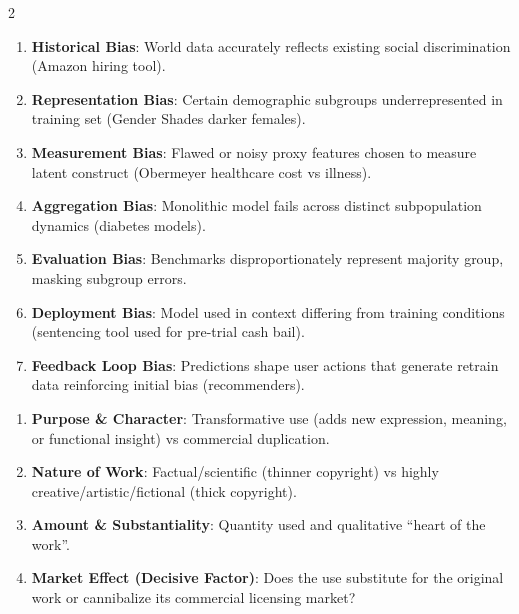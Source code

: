 \documentclass[9pt,a4paper]{extarticle}
\begin{document}
\begin{multicols}{2}
\begin{tcolorbox}[compact,colframe=secondary,title={3.5 The 7 Core AI Bias Types}]
\begin{enumerate}[leftmargin=10pt]
  \item \textbf{Historical Bias}: World data accurately reflects existing social discrimination (Amazon hiring tool).
  \item \textbf{Representation Bias}: Certain demographic subgroups underrepresented in training set (Gender Shades darker females).
  \item \textbf{Measurement Bias}: Flawed or noisy proxy features chosen to measure latent construct (Obermeyer healthcare cost vs illness).
  \item \textbf{Aggregation Bias}: Monolithic model fails across distinct subpopulation dynamics (diabetes models).
  \item \textbf{Evaluation Bias}: Benchmarks disproportionately represent majority group, masking subgroup errors.
  \item \textbf{Deployment Bias}: Model used in context differing from training conditions (sentencing tool used for pre-trial cash bail).
  \item \textbf{Feedback Loop Bias}: Predictions shape user actions that generate retrain data reinforcing initial bias (recommenders).
\end{enumerate}
\end{tcolorbox}

\begin{tcolorbox}[compact,colframe=primary,title={3.6 Fair Use 4-Factor Test (17 U.S.C. \S~107)}]
\begin{enumerate}[leftmargin=10pt]
  \item \textbf{Purpose \& Character}: Transformative use (adds new expression, meaning, or functional insight) vs commercial duplication.
  \item \textbf{Nature of Work}: Factual/scientific (thinner copyright) vs highly creative/artistic/fictional (thick copyright).
  \item \textbf{Amount \& Substantiality}: Quantity used and qualitative ``heart of the work''.
  \item \textbf{Market Effect (Decisive Factor)}: Does the use substitute for the original work or cannibalize its commercial licensing market?
\end{enumerate}
\end{tcolorbox}


\end{multicols}
\end{document}
